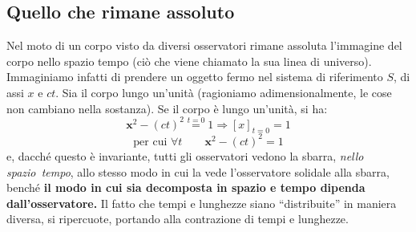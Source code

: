 \subsection{Quello che rimane assoluto}
\label{assoluto} Nel moto di un corpo visto da diversi osservatori
rimane assoluta l'immagine del corpo nello spazio tempo (ci\`o che
viene chiamato la sua linea di universo).
Immaginiamo infatti di prendere un oggetto fermo nel sistema di
riferimento $S$, di assi $x$ e $ct$. Sia il corpo lungo un'unit\`a
(ragioniamo adimensionalmente, le cose non cambiano nella
sostanza). Se il corpo \`e lungo un'unit\`a, si ha:
\begin{equation}
  \mathbf{x}^2-(ct)^2\stackrel{t=0}{=}1\Longrightarrow
  \left[x\right]_{t=0}=1
\end{equation}
\begin{equation}
  \mbox{per cui } \forall t \qquad \mathbf{x}^2-(ct)^2=1
\end{equation}
e, dacch\'e questo \`e invariante, tutti gli osservatori vedono la
sbarra, \emph{nello spazio~tempo}, allo stesso modo in cui la vede
l'osservatore solidale alla sbarra, bench\'e \textbf{il modo in cui
  sia decomposta in spazio e tempo dipenda dall'osservatore.} Il fatto
che tempi e lunghezze siano ``distribuite'' in maniera diversa, si
ripercuote, portando alla contrazione di tempi e lunghezze.

